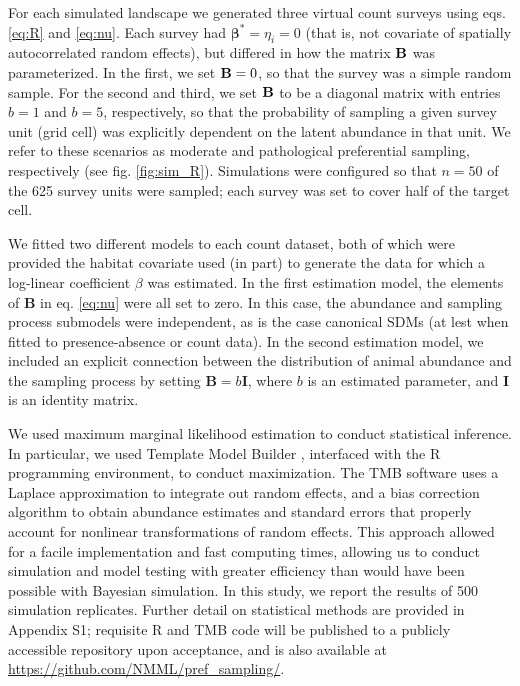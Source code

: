 \documentclass[times,mee,doublespace,]{besauth2}
\begin{document}
For each simulated landscape we generated three virtual count surveys using eqs. \ref{eq:R} and \ref{eq:nu}.  Each survey had $\boldsymbol{\beta}^*=\eta_i=0$ (that is, not covariate of spatially autocorrelated random effects), but differed in how the matrix ${\bf B}$ was parameterized.  In the first, we set ${\bf B}=0$, so that the survey was a simple random sample.  For the second and third, we set ${\bf B}$ to be a diagonal matrix with entries $b=1$ and $b=5$, respectively, so that the probability of sampling a given survey unit (grid cell) was explicitly dependent on the latent abundance in that unit.  We refer to these scenarios as moderate and pathological preferential sampling, respectively (see fig. \ref{fig:sim_R}).  Simulations were configured so that $n=50$ of the 625 survey units were sampled; each survey was set to cover half of the target cell.

We fitted two different models to each count dataset, both of which were provided the habitat covariate used (in part) to generate the data for which a log-linear coefficient $\beta$ was estimated.  In the first estimation model, the elements of \textbf{B} in eq. \ref{eq:nu} were all set to zero.  In this case, the abundance and sampling process submodels were independent, as is the case canonical SDMs (at lest when fitted to presence-absence or count data).  In the second estimation model, we included an explicit connection between the distribution of animal abundance and the sampling process by setting $\textbf{B}=b\textbf{I}$, where $b$ is an estimated parameter, and \textbf{I} is an identity matrix.

We used maximum marginal likelihood estimation to conduct statistical inference. In particular, we used Template Model Builder \citep[TMB; ][]{KristensenEtAl2015}, interfaced with the R programming environment, to conduct maximization. The TMB software uses a Laplace approximation to integrate out random effects, and a bias correction algorithm \citep{TierneyEtAl1989,ThorsonKristensenInPress} to obtain abundance estimates and standard errors that properly account for nonlinear transformations of random effects.  This approach allowed for a facile implementation and fast computing times, allowing us to conduct simulation and model testing with greater efficiency than would have been possible with Bayesian simulation.  In this study, we report the results of 500 simulation replicates.  Further detail on statistical methods are provided in Appendix S1; requisite R and TMB code will be published to a publicly accessible repository upon acceptance, and is also available at \url{https://github.com/NMML/pref_sampling/}.
\end{document}
